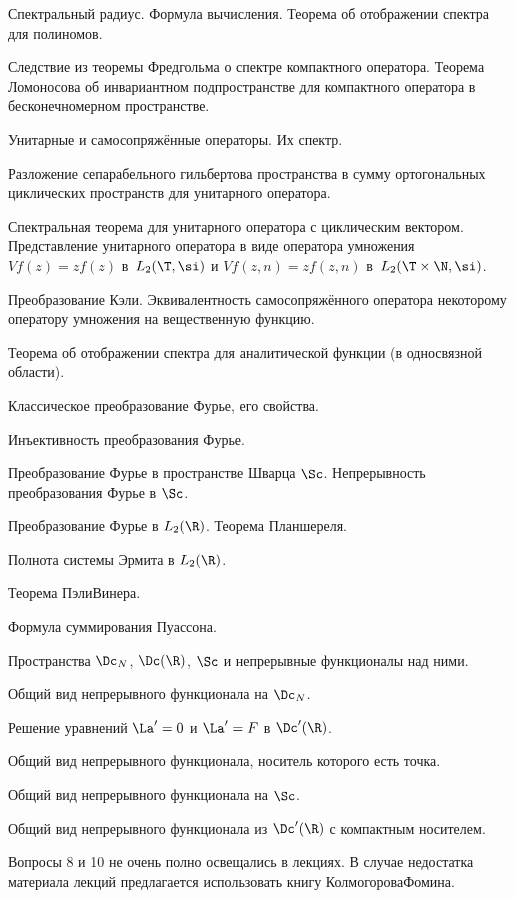 \documentclass[a4paper]{article}
\begin{document}
\begin{nums}{-2}
\item Спектральный радиус. Формула вычисления. Теорема об отображении спектра для полиномов.
\item Следствие из теоремы Фредгольма о спектре компактного оператора. Теорема Ломоносова
об инвариантном подпространстве для компактного оператора в бесконечномерном пространстве.
\item Унитарные и самосопряжённые операторы. Их спектр.
\item Разложение сепарабельного гильбертова пространства в сумму ортогональных циклических пространств
для унитарного оператора.
\item Спектральная теорема для унитарного оператора с циклическим вектором.
Представление унитарного оператора в виде оператора умножения
$V f(z) = z f(z)$ в~$L_2(\T,\si)$ и $V f(z,n) = z f(z,n)$  в~$L_2(\T\times\N, \si)$.
\item Преобразование Кэли. Эквивалентность самосопряжённого оператора некоторому оператору
умножения на вещественную функцию.
\item Теорема об отображении спектра для аналитической функции (в односвязной области).
\item Классическое преобразование Фурье, его свойства.
\item Инъективность преобразования Фурье.
\item Преобразование Фурье в пространстве Шварца $\Sc$. Непрерывность преобразования Фурье в $\Sc$.
\item Преобразование Фурье в $L_2(\R)$. Теорема Планшереля.
\item Полнота системы Эрмита в $L_2(\R)$.
\item Теорема Пэли\ч Винера.
\item Формула суммирования Пуассона.
\item Пространства $\Dc_N$, $\Dc(\R)$, $\Sc$ и непрерывные функционалы над ними.
\item Общий вид непрерывного функционала на $\Dc_N$.
\item Решение уравнений $\La'=0$ и $\La'=F$ в $\Dc'(\R)$.
\item Общий вид непрерывного функционала, носитель которого есть точка.
\item Общий вид непрерывного функционала на $\Sc$.
\item Общий вид непрерывного функционала из $\Dc'(\R)$ с компактным носителем.
\end{nums}

\begin{note}
Вопросы 8 и 10 не очень полно освещались в лекциях. В случае недостатка
материала лекций предлагается использовать книгу Колмогорова\ч Фомина.
\end{note}

\medskip\dmvntrail
\end{document}
